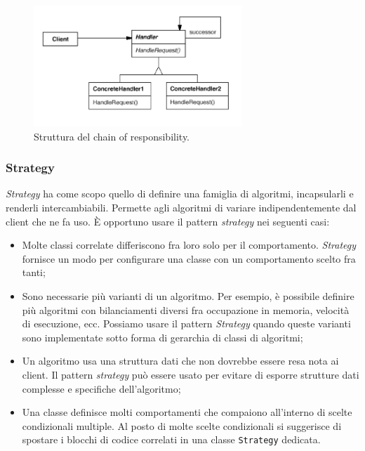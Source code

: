 \begin{figure}[h]
\centering \includegraphics[width=0.7\textwidth]{patterns/ChainOfResponsability.png}
\caption{Struttura del chain of responsibility.}
\label{fig:chainofresponsibility}
\end{figure}
	
\subsubsection{Strategy}

\textit{Strategy} ha come scopo quello di definire una famiglia di algoritmi, incapsularli e renderli intercambiabili. Permette agli algoritmi di variare indipendentemente dal client che ne fa uso. È opportuno usare il pattern \textit{strategy} nei seguenti casi:

\begin{itemize}

	\item Molte classi correlate differiscono fra loro solo per il comportamento. \textit{Strategy} fornisce un modo per configurare una classe con un comportamento scelto fra tanti;
	\item Sono necessarie più varianti di un algoritmo. Per esempio, è possibile definire più algoritmi con bilanciamenti diversi fra occupazione in memoria, velocità di esecuzione, ecc. Possiamo usare il pattern \textit{Strategy} quando queste varianti sono implementate sotto forma di gerarchia di classi di algoritmi;
	\item Un algoritmo usa una struttura dati che non dovrebbe essere resa nota ai client. Il pattern \textit{strategy} può essere usato per evitare di esporre strutture dati complesse e specifiche dell'algoritmo;
	\item Una classe definisce molti comportamenti che compaiono all'interno di scelte condizionali multiple. Al posto di molte scelte condizionali si suggerisce di spostare i blocchi di codice correlati in una classe \texttt{Strategy} dedicata.
	
\end{itemize}

